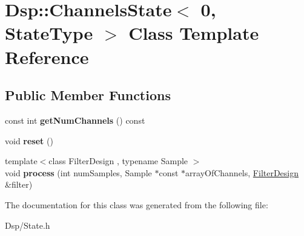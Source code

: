 \hypertarget{classDsp_1_1ChannelsState_3_010_00_01StateType_01_4}{\section{Dsp\-:\-:Channels\-State$<$ 0, State\-Type $>$ Class Template Reference}
\label{classDsp_1_1ChannelsState_3_010_00_01StateType_01_4}
}
\subsection*{Public Member Functions}
\begin{DoxyCompactItemize}
\item 
\hypertarget{classDsp_1_1ChannelsState_3_010_00_01StateType_01_4_aee0fdbd7c89ce606fb9a91e67147ce71}{const int {\bfseries get\-Num\-Channels} () const }\label{classDsp_1_1ChannelsState_3_010_00_01StateType_01_4_aee0fdbd7c89ce606fb9a91e67147ce71}

\item 
\hypertarget{classDsp_1_1ChannelsState_3_010_00_01StateType_01_4_a8dcfdc7b809724d2da89d6e7e6c65778}{void {\bfseries reset} ()}\label{classDsp_1_1ChannelsState_3_010_00_01StateType_01_4_a8dcfdc7b809724d2da89d6e7e6c65778}

\item 
\hypertarget{classDsp_1_1ChannelsState_3_010_00_01StateType_01_4_afae5a9e4cb19040f6257ce232d3e7c00}{{\footnotesize template$<$class Filter\-Design , typename Sample $>$ }\\void {\bfseries process} (int num\-Samples, Sample $\ast$const $\ast$array\-Of\-Channels, \hyperlink{classDsp_1_1FilterDesign}{Filter\-Design} \&filter)}\label{classDsp_1_1ChannelsState_3_010_00_01StateType_01_4_afae5a9e4cb19040f6257ce232d3e7c00}

\end{DoxyCompactItemize}


The documentation for this class was generated from the following file\-:\begin{DoxyCompactItemize}
\item 
Dsp/State.\-h\end{DoxyCompactItemize}
